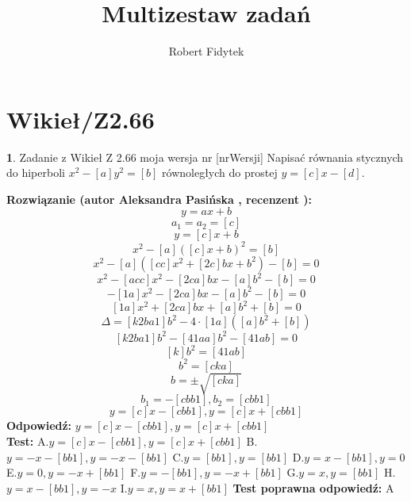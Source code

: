 \documentclass[12pt, a4paper]{article}
\title{Multizestaw zadań}
\author{Robert Fidytek}
\date{}
\theoremstyle{definition} %
\newtheorem{zad}{}
\newcommand{\kategoria}[1]{\section{#1}} %
\newcommand{\zadStart}[1]{\begin{zad}#1\newline} %
\newcommand{\zadStop}{\end{zad}}   %
\newcommand{\rozwStart}[2]{\noindent \textbf{Rozwiązanie (autor #1 , recenzent #2): }\newline} %
\newcommand{\rozwStop}{\newline}                                            %
\newcommand{\odpStart}{\noindent \textbf{Odpowiedź:}\newline}    %
\newcommand{\odpStop}{\newline}                                             %
\newcommand{\testStart}{\noindent \textbf{Test:}\newline} %
\newcommand{\testStop}{\newline} %
\newcommand{\kluczStart}{\noindent \textbf{Test poprawna odpowiedź:}\newline} %
\newcommand{\kluczStop}{\newline} %
\begin{document}
\maketitle


\kategoria{Wikieł/Z2.66}
\zadStart{Zadanie z Wikieł Z 2.66 moja wersja nr [nrWersji]}
Napisać równania stycznych do hiperboli $x^2-[a]y^2=[b]$ równoległych do prostej $y=[c]x-[d]$.
\zadStop
\rozwStart{Aleksandra Pasińska}{}
$$y=ax+b$$
$$a_1=a_2=[c]$$
$$y=[c]x+b$$
$$x^2-[a]([c]x+b)^2=[b]$$
$$x^2-[a]([cc]x^2+[2c]bx+b^2)-[b]=0$$
$$x^2-[acc]x^2-[2ca]bx-[a]b^2-[b]=0$$
$$-[1a]x^2-[2ca]bx-[a]b^2-[b]=0$$
$$[1a]x^2+[2ca]bx+[a]b^2+[b]=0$$
$$\Delta=[k2ba1]b^2-4\cdot[1a]([a]b^2+[b])$$
$$[k2ba1]b^2-[41aa]b^2-[41ab]=0$$
$$[k]b^2=[41ab]$$
$$b^2=[cka]$$
$$b=\pm \sqrt{[cka]}$$
$$b_1=-[cbb1],b_2=[cbb1]$$
$$ y=[c]x-[cbb1], y=[c]x+[cbb1]$$
\rozwStop
\odpStart
$ y=[c]x-[cbb1], y=[c]x+[cbb1]$\\
\odpStop
\testStart
A.$ y=[c]x-[cbb1], y=[c]x+[cbb1]$
B.$ y=-x-[bb1], y=-x-[bb1]$
C.$ y=[bb1], y=[bb1]$
D.$ y=x-[bb1], y=0$
E.$ y=0, y=-x+[bb1]$
F.$ y=-[bb1], y=-x+[bb1]$
G.$ y=x, y=[bb1]$
H.$ y=x-[bb1], y=-x$
I.$ y=x, y=x+[bb1]$
\testStop
\kluczStart
A
\kluczStop
\end{document}

